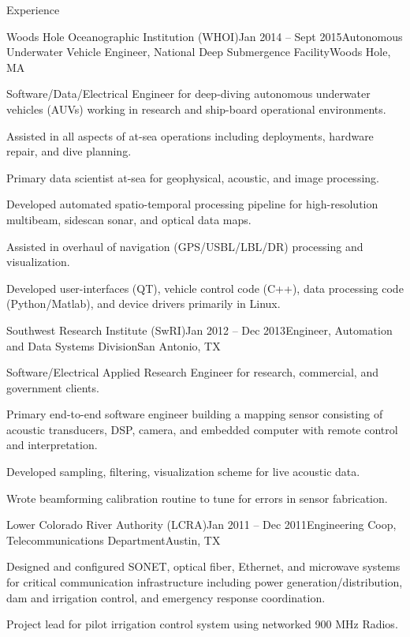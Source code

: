 \documentclass{resume} %
\begin{document}
\begin{rSection}{Experience}
\begin{rSubsection}{Woods Hole Oceanographic Institution (WHOI)}{Jan 2014 -- Sept 2015}{Autonomous Underwater Vehicle Engineer, National Deep Submergence Facility}{Woods Hole, MA}
\item{Software/Data/Electrical Engineer for deep-diving autonomous underwater vehicles (AUVs) working in research and ship-board operational environments.}
\item{Assisted in all aspects of at-sea operations including deployments, hardware repair, and dive planning.}
\item{Primary data scientist at-sea for geophysical, acoustic, and image processing.}
\item{Developed automated spatio-temporal processing pipeline for high-resolution multibeam, sidescan sonar, and optical data maps.}
\item{Assisted in overhaul of navigation (GPS/USBL/LBL/DR) processing and visualization.}
\item{Developed user-interfaces (QT), vehicle control code (C++), data processing code (Python/Matlab), and device drivers primarily in Linux.}
\end{rSubsection}
%
\begin{rSubsection}{Southwest Research Institute (SwRI)}{Jan 2012 -- Dec 2013}{Engineer, Automation and Data Systems Division}{San Antonio, TX}{}
\item{Software/Electrical Applied Research Engineer for research, commercial, and government clients.}
\item{Primary end-to-end software engineer building a mapping sensor consisting of acoustic transducers, DSP, camera, and embedded computer with remote control and interpretation.}
\item{Developed sampling, filtering, visualization scheme for live acoustic data.}
\item{Wrote beamforming calibration routine to tune for errors in sensor fabrication.}
\end{rSubsection}


\begin{rSubsection}{Lower Colorado River Authority (LCRA)}{Jan 2011 -- Dec 2011}{Engineering Coop, Telecommunications Department}{Austin, TX}
\item{Designed and configured SONET, optical fiber, Ethernet, and microwave systems for critical communication infrastructure including power generation/distribution, dam and 
            irrigation control, and emergency response coordination. }
\item{Project lead for pilot irrigation control system using networked 900 MHz Radios.}
\end{rSubsection}
\end{rSection}
\end{document}
